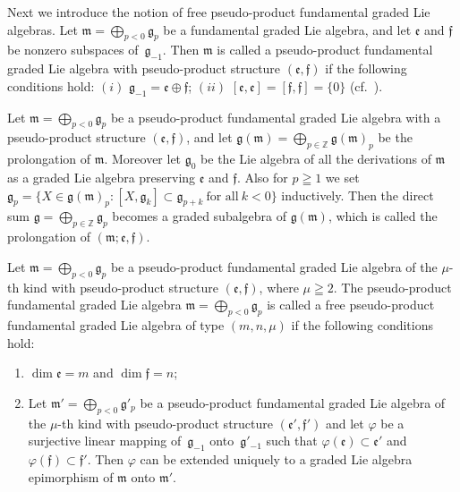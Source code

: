 \documentclass[pdftex]{sigma}
\numberwithin{equation}{section}
\numberwithin{theorem}{section}
\numberwithin{proposition}{section}
\numberwithin{lemma}{section}
\numberwithin{corollary}{section}
\numberwithin{definition}{section}
\numberwithin{example}{section}
\numberwithin{remark}{section}
\numberwithin{note}{section}
\newcommand{\gla}[1]{\mathfrak#1=\bigoplus\limits_{p\in\mathbb Z}\mathfrak#1_p} \renewcommand{\labelenumi}{{\rm (\arabic{enumi})}}
\begin{document}
Next we introduce the notion of free pseudo-product fundamental graded Lie
algebras.
Let $\mathfrak m=\bigoplus\limits_{p<0}\mathfrak g_p$ be a fundamental graded Lie algebra, and let
$\mathfrak e$ and $\mathfrak f$ be nonzero subspaces of~$\mathfrak g_{-1}$.
Then $\mathfrak m$ is called a pseudo-product fundamental graded Lie algebra
with pseudo-product structure $(\mathfrak e,\mathfrak f)$
if the following conditions hold:
$(i)$ $\mathfrak g_{-1}=\mathfrak e\oplus\mathfrak f$;
$(ii)$ $[\mathfrak e,\mathfrak e]=[\mathfrak f,\mathfrak f]=\{0\}$ (cf.~\cite{tan85:01}).

Let $\mathfrak m=\bigoplus\limits_{p<0}\mathfrak g_p$ be a pseudo-product
fundamental graded Lie algebra with a pseudo-product structure
$(\mathfrak e,\mathfrak f)$, and let
$\mathfrak g(\mathfrak m)=\bigoplus\limits_{p\in\mathbb Z}\mathfrak g(\mathfrak m)_p$ be the prolongation of $\mathfrak m$. Moreover let $\mathfrak g_0$  be the Lie algebra of all the derivations of
$\mathfrak m$ as a graded Lie algebra
preserving $\mathfrak e$ and $\mathfrak f$.
Also for $p\geqq1$ we set $\mathfrak g_p=\{X\in\mathfrak g(\mathfrak m)_p:
[X,\mathfrak g_k]\subset \mathfrak g_{p+k}\ \text{for all}\ k<0\}$ inductively.
Then the direct sum $\gla g$ becomes a graded subalgebra of $\mathfrak g(\mathfrak m)$, which is called the prolongation of
$(\mathfrak m;\mathfrak e,\mathfrak f)$.

Let $\mathfrak m=\bigoplus\limits_{p<0}\mathfrak g_p$ be a pseudo-product
fundamental graded Lie algebra of the $\mu$-th kind with pseudo-product
structure $(\mathfrak e,\mathfrak f)$, where $\mu\geqq2$.
The pseudo-product fundamental graded Lie algebra
$\mathfrak m=\bigoplus\limits_{p<0}\mathfrak g_p$ is called a free pseudo-product fundamental graded Lie algebra of type $(m,n,\mu)$
if the following conditions hold:
\begin{enumerate}\itemsep=0pt
\renewcommand{\labelenumi}{$(\roman{enumi})$}
\item $\dim\mathfrak e=m$ and $\dim\mathfrak f=n$;
\item
Let $\mathfrak m'=\bigoplus\limits_{p<0}\mathfrak g'_p$ be a pseudo-product
fundamental graded Lie algebra of the $\mu$-th kind with pseudo-product
structure $(\mathfrak e',\mathfrak f')$ and let $\varphi$ be a surjective
linear mapping of~$\mathfrak g_{-1}$ onto~$\mathfrak g'_{-1}$ such that
$\varphi(\mathfrak e)\subset\mathfrak e'$ and
$\varphi(\mathfrak f)\subset\mathfrak f'$.
Then $\varphi$ can be extended uniquely to a graded Lie algebra
epimorphism of $\mathfrak m$ onto $\mathfrak m'$.
\end{enumerate}
\end{document}

